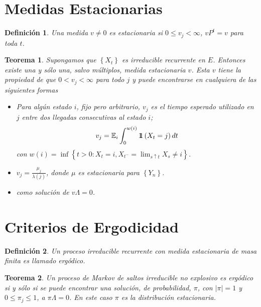 \documentclass{article}
\newtheorem{Def}{Definición}
\newtheorem{Teo}{Teorema}
\newcommand{\esp}{\mathbb{E}}
\newcommand{\indora}{\mbox{$1$\hspace{-0.8ex}$1$}}
\begin{document}
\section{Medidas Estacionarias}
%


\begin{Def}
Una medida $v\neq0$ es estacionaria si $0\leq v_{j}<\infty$, $vP^{t}=v$ para toda $t$.
\end{Def}

\begin{Teo}\label{Teo.4.2}
Supongamos que $\left\{X_{t}\right\}$ es irreducible recurrente en $E$. Entonces existe una y s\'olo una, salvo m\'ultiplos, medida estacionaria $v$. Esta $v$ tiene la propiedad de que $0<v_{j}<\infty$ para todo $j$ y puede encontrarse en cualquiera de las siguientes formas

\begin{itemize}
\item[i)] Para alg\'un estado $i$, fijo pero arbitrario, $v_{j}$ es el tiempo esperado utilizado en $j$ entre dos llegadas consecutivas al estado $i$;
\begin{equation}\label{Eq.4.2}
v_{j}=\esp_{i}\int_{0}^{w\left(i\right)}\indora\left(X_{t}=j\right)dt
\end{equation}
con $w\left(i\right)=\inf\left\{t>0:X_{t}=i,X_{t^{-}}=\lim_{s\uparrow t}X_{s}\neq i\right\}$. 
\item[ii)]
$v_{j}=\frac{\mu_{j}}{\lambda\left(j\right)}$, donde $\mu$ es estacionaria para $\left\{Y_{n}\right\}$. 
\item[iii)] como soluci\'on de $v\Lambda=0$.
\end{itemize}
\end{Teo}


\section{Criterios de Ergodicidad}
%

\begin{Def}
Un proceso irreducible recurrente con medida estacionaria de masa finita es llamado erg\'odico.
\end{Def}

\begin{Teo}\label{Teo.4.3}
Un proceso de Markov de saltos irreducible no explosivo es erg\'odico si y s\'olo si se puede encontrar una soluci\'on, de probabilidad, $\pi$, con $|\pi|=1$ y $0\leq\pi_{j}\leq1$, a $\pi\Lambda=0$. En este caso $\pi$ es la distribuci\'on estacionaria.
\end{Teo}
\end{document}
